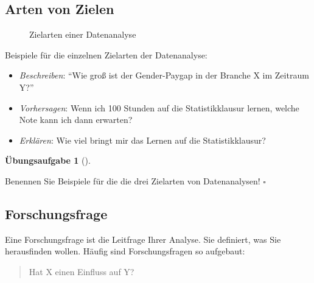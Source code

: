 \documentclass[
  a4paper,
  DIV=11]{scrreprt}
\providecommand{\tightlist}{%
  \setlength{\itemsep}{0pt}\setlength{\parskip}{0pt}}\usepackage{longtable,booktabs,array}
\theoremstyle{definition}
\newtheorem{exercise}{Übungsaufgabe}[chapter]
\theoremstyle{definition}
\theoremstyle{definition}
\theoremstyle{remark}
\begin{document}
\subsection{Arten von Zielen}\label{arten-von-zielen}

\begin{figure}


\caption{\label{fig-ziele}Zielarten einer Datenanalyse}

\end{figure}%

Beispiele für die einzelnen Zielarten der Datenanalyse:

\begin{itemize}
\tightlist
\item
  \emph{Beschreiben}: ``Wie groß ist der Gender-Paygap in der Branche X
  im Zeitraum Y?''
\item
  \emph{Vorhersagen}: Wenn ich 100 Stunden auf die Statistikklausur
  lernen, welche Note kann ich dann erwarten?
\item
  \emph{Erklären}: Wie viel bringt mir das Lernen auf die
  Statistikklausur?
\end{itemize}

\begin{exercise}[]\protect\hypertarget{exr-ziele-stat}{}\label{exr-ziele-stat}

Benennen Sie Beispiele für die die drei Zielarten von Datenanalysen!
\(\square\)

\end{exercise}

\subsection{Forschungsfrage}\label{forschungsfrage}

Eine Forschungsfrage ist die Leitfrage Ihrer Analyse. Sie definiert, was
Sie herausfinden wollen. Häufig sind Forschungsfragen so aufgebaut:

\begin{quote}
Hat X einen Einfluss auf Y?
\end{quote}
\end{document}
